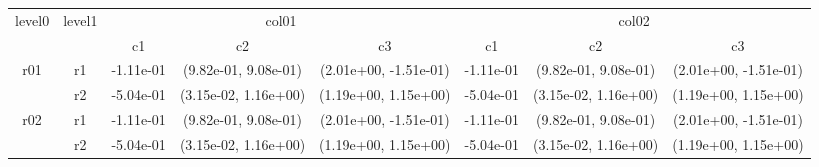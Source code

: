 \begin{tabular}{cccccccc}
\toprule
\multirow{2}{*}{level0} & \multirow{2}{*}{level1}&\multicolumn{3}{c}{col01}&\multicolumn{3}{c}{col02}\tabularnewline
\cmidrule(lr){3-5}
\cmidrule(lr){6-8}
&&c1&c2&c3&c1&c2&c3\tabularnewline
\midrule
\midrule
\multirow{2}{*}{r01}&r1&-1.11e-01& (9.82e-01, 9.08e-01)& (2.01e+00, -1.51e-01)&-1.11e-01& (9.82e-01, 9.08e-01)& (2.01e+00, -1.51e-01)\tabularnewline
&r2&-5.04e-01& (3.15e-02, 1.16e+00)& (1.19e+00, 1.15e+00)&-5.04e-01& (3.15e-02, 1.16e+00)& (1.19e+00, 1.15e+00)\tabularnewline
\midrule
\multirow{2}{*}{r02}&r1&-1.11e-01& (9.82e-01, 9.08e-01)& (2.01e+00, -1.51e-01)&-1.11e-01& (9.82e-01, 9.08e-01)& (2.01e+00, -1.51e-01)\tabularnewline
&r2&-5.04e-01& (3.15e-02, 1.16e+00)& (1.19e+00, 1.15e+00)&-5.04e-01& (3.15e-02, 1.16e+00)& (1.19e+00, 1.15e+00)\tabularnewline
\bottomrule
\end{tabular}
